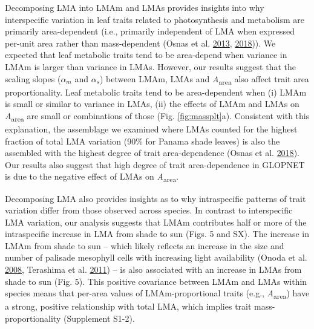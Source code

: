 \documentclass[
  12pt,
]{article}
\begin{document}
Decomposing LMA into LMAm and LMAs provides insights into why interspecific variation in leaf traits related to photosynthesis and metabolism are primarily area-dependent (i.e., primarily independent of LMA when expressed per-unit area rather than mass-dependent (Osnas et al. \protect\hyperlink{ref-Osnas2013}{2013}, \protect\hyperlink{ref-Osnas2018}{2018})).
We expected that leaf metabolic traits tend to be area-depend when variance in LMAm is larger than variance in LMAs.
However, our results suggest that the scaling slopes (\(\alpha_m\) and \(\alpha_s\)) between LMAm, LMAs and \emph{A}\textsubscript{area} also affect trait area proportionality.
Leaf metabolic traits tend to be area-dependent when (i) LMAm is small or similar to variance in LMAs, (ii) the effects of LMAm and LMAs on \emph{A}\textsubscript{area} are small or combinations of those (Fig. \ref{fig:massplt}a).
Consistent with this explanation, the assemblage we examined where LMAs counted for the highest fraction of total LMA variation (90\% for Panama shade leaves) is also the assembled with the highest degree of trait area-dependence (Osnas et al. \protect\hyperlink{ref-Osnas2018}{2018}).
Our results also suggest that high degree of trait area-dependence in GLOPNET is due to the negative effect of LMAs on \emph{A}\textsubscript{area}.

Decomposing LMA also provides insights as to why intraspecific patterns of trait variation differ from those observed across species.
In contrast to interspecific LMA variation, our analysis suggests that LMAm contributes half or more of the intraspecific increase in LMA from shade to sun (Figs. 5 and SX).
The increase in LMAm from shade to sun -- which likely reflects an increase in the size and number of palisade mesophyll cells with increasing light availability (Onoda et al. \protect\hyperlink{ref-Onoda2008}{2008}, Terashima et al. \protect\hyperlink{ref-Terashima2011}{2011}) -- is also associated with an increase in LMAs from shade to sun (Fig. 5).
This positive covariance between LMAm and LMAs within species means that per-area values of LMAm-proportional traits (e.g., \emph{A}\textsubscript{area}) have a strong, positive relationship with total LMA, which implies trait mass-proportionality (Supplement S1-2).
\end{document}
